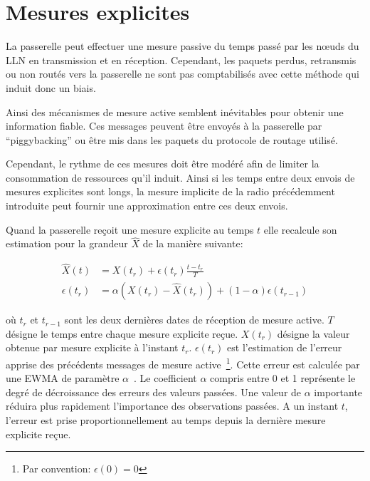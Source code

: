 \section{Mesures explicites}
\label{supervision:explicite}

La passerelle peut effectuer une mesure passive du temps passé par les nœuds du \ac{LLN} en transmission et en réception.
Cependant, les paquets perdus, retransmis ou non routés vers la passerelle ne sont pas comptabilisés avec cette méthode qui induit donc un biais.

Ainsi des mécanismes de mesure active semblent inévitables pour obtenir une information fiable.
Ces messages peuvent être envoyés à la passerelle par ``piggybacking'' ou être mis dans les paquets du protocole de routage utilisé.

Cependant, le rythme de ces mesures doit être modéré afin de limiter la consommation de ressources qu'il induit.
Ainsi si les temps entre deux envois de mesures explicites sont longs, la mesure implicite de la radio précédemment introduite peut fournir une approximation entre ces deux envois.

Quand la passerelle reçoit une mesure explicite au temps $t$ elle recalcule son estimation pour la grandeur $\widehat{X}$ de la manière suivante:

\begin{align}
  \widehat{X}(t) &= X(t_r) + \epsilon(t_r)\frac{t - t_r}{T}\\
  \epsilon(t_r) &= \alpha (X(t_r) - \widehat{X}(t_r)) + (1 - \alpha)\epsilon(t_{r-1})
  \label{supervision:eqn:bias}
\end{align}

où $t_r$ et $t_{r-1}$ sont les deux dernières dates de réception de mesure active.
$T$ désigne le temps entre chaque mesure explicite reçue.
$X(t_r)$ désigne la valeur obtenue par mesure explicite à l'instant $t_r$.
$\epsilon(t_r)$ est l’estimation de l'erreur apprise des précédents messages de mesure active~\footnote{Par convention: $\epsilon(0) = 0$}.
Cette erreur est calculée par une \ac{EWMA} de paramètre $\alpha$~\cite{mckinney2012python}.
Le coefficient $\alpha$ compris entre 0 et 1 représente le degré de décroissance des erreurs des valeurs passées.
Une valeur de $\alpha$ importante réduira plus rapidement l'importance des observations passées.
A un instant $t$, l'erreur est prise proportionnellement au temps depuis la dernière mesure explicite reçue.



